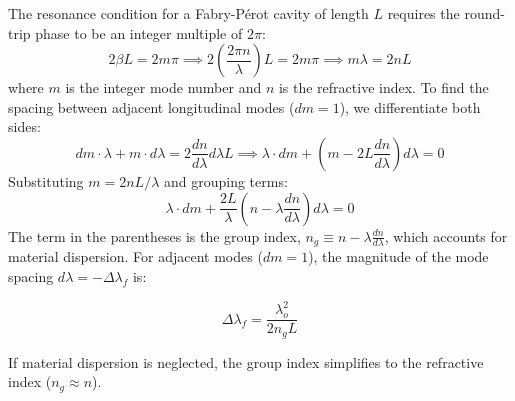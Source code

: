 The resonance condition for a Fabry-Pérot cavity of length $L$ requires the round-trip phase to be an integer multiple of $2\pi$:
\begin{equation*}
    2\beta L = 2m\pi \implies 2\left(\frac{2\pi n}{\lambda}\right) L = 2m\pi \implies m\lambda = 2nL
\end{equation*}
where $m$ is the integer mode number and $n$ is the refractive index. To find the spacing between adjacent longitudinal modes ($dm = 1$), we differentiate both sides:
\begin{equation*}
    dm \cdot \lambda + m \cdot d\lambda = 2\frac{dn}{d\lambda} d\lambda L \implies \lambda \cdot dm + \left(m - 2L\frac{dn}{d\lambda}\right) d\lambda = 0
\end{equation*}
Substituting $m = 2nL/\lambda$ and grouping terms:
\begin{equation*}
    \lambda \cdot dm + \frac{2L}{\lambda}\left(n - \lambda\frac{dn}{d\lambda}\right) d\lambda = 0
\end{equation*}
The term in the parentheses is the group index, $n_g \equiv n - \lambda\frac{dn}{d\lambda}$, which accounts for material dispersion. For adjacent modes ($dm = 1$), the magnitude of the mode spacing $d\lambda = -\Delta\lambda_f$ is:
\begin{keyresult}
    \begin{equation}
        \Delta\lambda_f = \frac{\lambda_o^2}{2 n_g L}
    \end{equation}
\end{keyresult}
If material dispersion is neglected, the group index simplifies to the refractive index ($n_g \approx n$).

